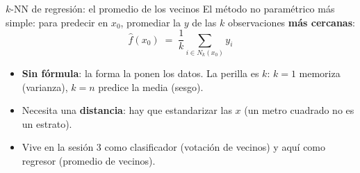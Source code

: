 \documentclass{beamer}
\newcommand{\1}{\mathbb{I}}
\begin{document}
\begin{frame}{$k$-NN de regresión: el promedio de los vecinos}
\small
El método no paramétrico más simple: para predecir en $x_0$, promediar la $y$ de las $k$ observaciones \textbf{más cercanas}:
\[ \hat{f}(x_0) \;=\; \frac{1}{k} \sum_{i \in N_k(x_0)} y_i \]
\begin{center}
\end{center}
\pause
\begin{itemize}\itemsep3pt
  \item \textbf{Sin fórmula}: la forma la ponen los datos. La perilla es $k$: $k = 1$ memoriza (varianza), $k = n$ predice la media (sesgo).
  \item Necesita una \textbf{distancia}: hay que estandarizar las $x$ (un metro cuadrado no es un estrato).
  \item Vive en la sesión 3 como clasificador (votación de vecinos) y aquí como regresor (promedio de vecinos).
\end{itemize}
\end{frame}
\end{document}
